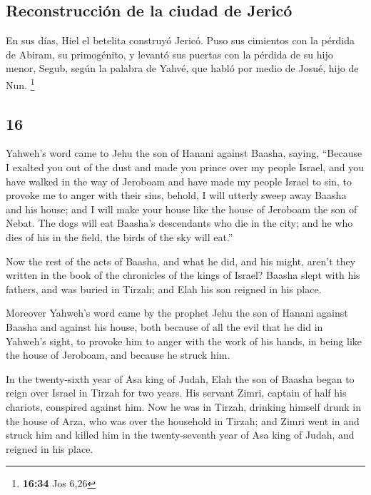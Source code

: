 \begin{paracol}{2}
\hypertarget{reconstrucciuxf3n-de-la-ciudad-de-jericuxf3}{%
\subsection{Reconstrucción de la ciudad de
Jericó}\label{reconstrucciuxf3n-de-la-ciudad-de-jericuxf3}}

 En sus días, Hiel el betelita construyó Jericó. Puso sus
cimientos con la pérdida de Abiram, su primogénito, y levantó sus
puertas con la pérdida de su hijo menor, Segub, según la palabra de
Yahvé, que habló por medio de Josué, hijo de Nun. \footnote{\textbf{16:34}
  Jos 6,26}

\switchcolumn
\begin{otherlanguage}{english}

\hypertarget{section-31}{%
\section{16}\label{section-31}}

 Yahweh's word came to Jehu the son of Hanani against
Baasha, saying,  ``Because I exalted you out of the dust
and made you prince over my people Israel, and you have walked in the
way of Jeroboam and have made my people Israel to sin, to provoke me to
anger with their sins,  behold, I will utterly sweep away
Baasha and his house; and I will make your house like the house of
Jeroboam the son of Nebat.  The dogs will eat Baasha's
descendants who die in the city; and he who dies of his in the field,
the birds of the sky will eat.''

 Now the rest of the acts of Baasha, and what he did, and
his might, aren't they written in the book of the chronicles of the
kings of Israel?  Baasha slept with his fathers, and was
buried in Tirzah; and Elah his son reigned in his place.

 Moreover Yahweh's word came by the prophet Jehu the son
of Hanani against Baasha and against his house, both because of all the
evil that he did in Yahweh's sight, to provoke him to anger with the
work of his hands, in being like the house of Jeroboam, and because he
struck him.

 In the twenty-sixth year of Asa king of Judah, Elah the
son of Baasha began to reign over Israel in Tirzah for two years.
 His servant Zimri, captain of half his chariots,
conspired against him. Now he was in Tirzah, drinking himself drunk in
the house of Arza, who was over the household in Tirzah; 
and Zimri went in and struck him and killed him in the twenty-seventh
year of Asa king of Judah, and reigned in his place.


\end{otherlanguage}
\end{paracol}
